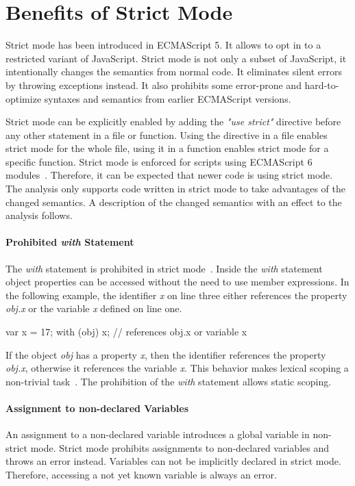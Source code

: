 \section{Benefits of Strict Mode}\label{sec:strict-mode}
Strict mode has been introduced in ECMAScript 5. It allows to opt in to a restricted variant of JavaScript. Strict mode is not only a subset of JavaScript, it intentionally changes the semantics from normal code. It eliminates silent errors by throwing exceptions instead. It also prohibits some error-prone and hard-to-optimize syntaxes and semantics from earlier ECMAScript versions. 

Strict mode can be explicitly enabled by adding the \textit{"use strict"} directive before any other statement in a file or function. Using the directive in a file enables strict mode for the whole file, using it in a function enables strict mode for a specific function. Strict mode is enforced for scripts using ECMAScript 6 modules~\cite[10.2.1]{Ecma2015}. Therefore, it can be expected that newer code is using strict mode. The analysis only supports code written in strict mode to take advantages of the changed semantics. A description of the changed semantics with an effect to the analysis follows.

\paragraph{Prohibited \textit{with} Statement}
The \textit{with} statement is prohibited in strict mode~\cite[Annex C]{Ecma2015}. Inside the \textit{with} statement object properties can be accessed without the need to use member expressions. In the following example, the identifier \textit{x} on line three either references the property \textit{obj.x} or the variable \textit{x} defined on line one.

\begin{javascriptcode}
var x = 17;
with (obj) {
	x; // references obj.x or variable x
}
\end{javascriptcode}

If the object \textit{obj} has a property \textit{x}, then the identifier references the property \textit{obj.x}, otherwise it references the variable \textit{x}. This behavior makes lexical scoping a non-trivial task~\cite{JensenMollerThiemann2009}. The prohibition of the \textit{with} statement allows static scoping.

\paragraph{Assignment to non-declared Variables}
An assignment to a non-declared variable introduces a global variable in non-strict mode. Strict mode prohibits assignments to non-declared variables and throws an error instead. Variables can not be implicitly declared in strict mode. Therefore, accessing a not yet known variable is always an error.
